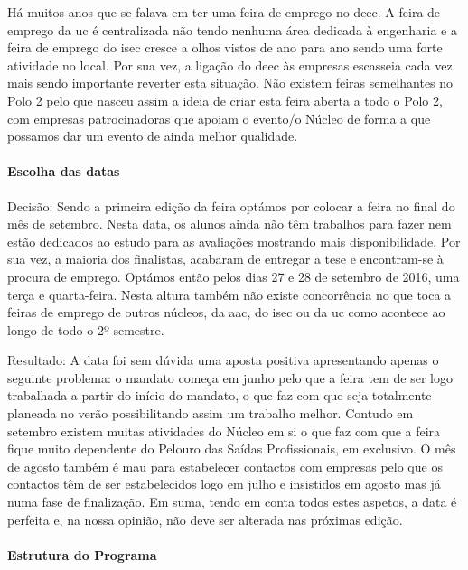Há muitos anos que se falava em ter uma feira de emprego no \acrshort{deec}. A feira de emprego da \acrshort{uc} é centralizada não tendo nenhuma área dedicada à engenharia e a feira de emprego do \acrfull{isec} cresce a olhos vistos de ano para ano sendo uma forte atividade no local. Por sua vez, a ligação do \acrshort{deec} às empresas escasseia cada vez mais sendo importante reverter esta situação. Não existem feiras semelhantes no Polo 2 pelo que nasceu assim a ideia de criar esta feira aberta a todo o Polo 2, com empresas patrocinadoras que apoiam o evento/o Núcleo de forma a que possamos dar um evento de ainda melhor qualidade. 

\paragraph{Escolha das datas}

Decisão: Sendo a primeira edição da feira optámos por colocar a feira no final do mês de setembro. Nesta data, os alunos ainda não têm trabalhos para fazer nem estão dedicados ao estudo para as avaliações mostrando mais disponibilidade. Por sua vez, a maioria dos finalistas, acabaram de entregar a tese e encontram-se à procura de emprego. Optámos então pelos dias 27 e 28 de setembro de 2016, uma terça e quarta-feira. Nesta altura também não existe concorrência no que toca a feiras de emprego de outros núcleos, da \acrshort{aac}, do \acrshort{isec} ou da \acrshort{uc} como acontece ao longo de todo o 2º semestre. 

Resultado: A data foi sem dúvida uma aposta positiva apresentando apenas o seguinte problema: o mandato começa em junho pelo que a feira tem de ser logo trabalhada a partir do início do mandato, o que faz com que seja totalmente planeada no verão possibilitando assim um trabalho melhor. Contudo em setembro existem muitas atividades do Núcleo em si o que faz com que a feira fique muito dependente do Pelouro das Saídas Profissionais, em exclusivo. O mês de agosto também é mau para estabelecer contactos com empresas pelo que os contactos têm de ser estabelecidos logo em julho e insistidos em agosto mas já numa fase de finalização. Em suma, tendo em conta todos estes aspetos, a data é perfeita e, na nossa opinião, não deve ser alterada nas próximas edição.  

\paragraph{Estrutura do Programa}

